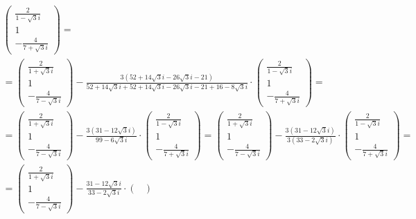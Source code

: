 \begin{multline*}
    \begin{pmatrix}
        \frac2{1 - \sqrt3i} \\
        1 \\
        -\frac4{7 + \sqrt3i}
    \end{pmatrix} = \\
    =
    \begin{pmatrix}
        \frac2{1 + \sqrt3i} \\
        1 \\
        -\frac4{7 - \sqrt3i}
    \end{pmatrix} - \frac{3(52 + 14\sqrt3i - 26\sqrt3i - 21)}{52 + 14\sqrt3i + 52 + 14\sqrt3i - 26\sqrt3i - 21 + 16 - 8\sqrt3i} \cdot
    \begin{pmatrix}
        \frac2{1 - \sqrt3i} \\
        1 \\
        -\frac4{7 + \sqrt3i}
    \end{pmatrix} = \\
    =
    \begin{pmatrix}
        \frac2{1 + \sqrt3i} \\
        1 \\
        -\frac4{7 - \sqrt3i}
    \end{pmatrix} - \frac{3(31 - 12\sqrt3i)}{99 - 6\sqrt3i} \cdot
    \begin{pmatrix}
        \frac2{1 - \sqrt3i} \\
        1 \\
        -\frac4{7 + \sqrt3i}
    \end{pmatrix} =
    \begin{pmatrix}
        \frac2{1 + \sqrt3i} \\
        1 \\
        -\frac4{7 - \sqrt3i}
    \end{pmatrix} - \frac{3(31 - 12\sqrt3i)}{3(33 - 2\sqrt3i)} \cdot
    \begin{pmatrix}
        \frac2{1 - \sqrt3i} \\
        1 \\
        -\frac4{7 + \sqrt3i}
    \end{pmatrix} = \\
    =
    \begin{pmatrix}
        \frac2{1 + \sqrt3i} \\
        1 \\
        -\frac4{7 - \sqrt3i}
    \end{pmatrix} - \frac{31 - 12\sqrt3i}{33 - 2\sqrt3i} \cdot
    \begin{pmatrix}

\end{pmatrix}
\end{multline*}
